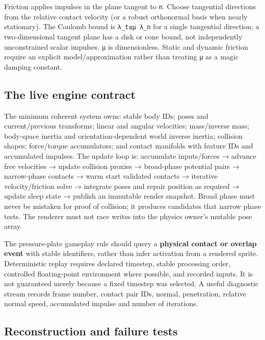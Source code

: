 Friction applies impulses in the plane tangent to \texttt{n}. Choose tangential directions from the relative contact velocity (or a robust orthonormal basis when nearly stationary). The Coulomb bound is \texttt{\textbar{}λ\_t\textbar{}≤μ\ λ\_n} for a single tangential direction; a two-dimensional tangent plane has a disk or cone bound, not independently unconstrained scalar impulses. \texttt{μ} is dimensionless. Static and dynamic friction require an explicit model/approximation rather than treating \texttt{μ} as a magic damping constant.

\subsection{The live engine contract}\label{06-engine-ii-ch033-the-live-engine-contract}

The minimum coherent system owns: stable body IDs; poses and current/previous transforms; linear and angular velocities; mass/inverse mass; body-space inertia and orientation-dependent world inverse inertia; collision shapes; force/torque accumulators; and contact manifolds with feature IDs and accumulated impulses. The update loop is: accumulate inputs/forces → advance free velocities → update collision proxies → broad-phase potential pairs → narrow-phase contacts → warm start validated contacts → iterative velocity/friction solve → integrate poses and repair position as required → update sleep state → publish an immutable render snapshot. Broad phase must never be mistaken for proof of collision; it produces candidates that narrow phase tests. The renderer must not race writes into the physics owner's mutable pose array.

The pressure-plate gameplay rule should query a \textbf{physical contact or overlap event} with stable identifiers, rather than infer activation from a rendered sprite. Deterministic replay requires declared timestep, stable processing order, controlled floating-point environment where possible, and recorded inputs. It is not guaranteed merely because a fixed timestep was selected. A useful diagnostic stream records frame number, contact pair IDs, normal, penetration, relative normal speed, accumulated impulse and number of iterations.

\subsection{Reconstruction and failure tests}\label{06-engine-ii-ch033-reconstruction-and-failure-tests}

